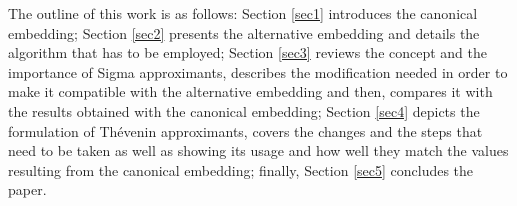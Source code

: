 \documentclass[journal]{IEEEtran}
\begin{document}
The outline of this work is as follows: Section \ref{sec1} introduces the canonical embedding; Section \ref{sec2} presents the alternative embedding and details the algorithm that has to be employed; Section \ref{sec3} reviews the concept and the importance of Sigma approximants, describes the modification needed in order to make it compatible with the alternative embedding and then, compares it with the results obtained with the canonical embedding; Section \ref{sec4} depicts the formulation of Thévenin approximants, covers the changes and the steps that need to be taken as well as showing its usage and how well they match the values resulting from the canonical embedding; finally, Section \ref{sec5} concludes the paper.





%
%

\end{document}
